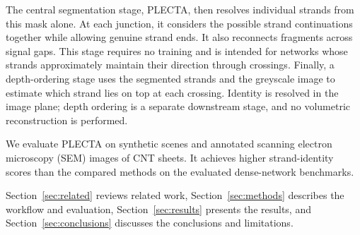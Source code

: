 The central segmentation stage, PLECTA, then resolves individual strands from
this mask alone. At each junction, it considers the possible strand
continuations together while allowing genuine strand ends. It also reconnects
fragments across signal gaps. This stage requires no training and is intended
for networks whose strands approximately maintain their direction through
crossings. Finally, a depth-ordering stage uses the segmented strands and
the greyscale image to estimate which strand lies on top at each crossing.
Identity is resolved in the image plane; depth ordering is a separate
downstream stage, and no volumetric reconstruction is performed.

We evaluate PLECTA on synthetic scenes and annotated scanning electron
microscopy (SEM) images of CNT sheets. It achieves higher strand-identity
scores than the compared methods on the evaluated dense-network benchmarks.

Section~\ref{sec:related} reviews related
work, Section~\ref{sec:methods} describes the workflow and evaluation,
Section~\ref{sec:results} presents the results, and
Section~\ref{sec:conclusions} discusses the conclusions and limitations.


